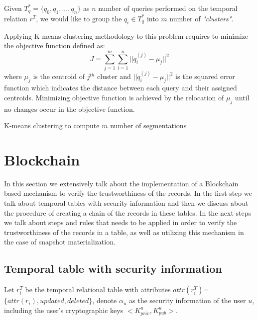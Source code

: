 \begin{prop} 
	Given $T_q^* = \{q_0,q_1,...,q_n\}$ as $n$ number of queries performed on the temporal relation $r^T$, we would like to group the $q_i \in T_q^*$ into $m$ number of \textit{"clusters"}. 
\label{prop:heuristic_method}
\end{prop}
Applying K-means clustering methodology to this problem requires to minimize the objective function defined as:
$$J = \sum_{j=1}^{m} \sum_{i=1}^{n} ||q_i^{(j)}-\mu_j||^2$$
where $\mu_j$ is the centroid of $j^{th}$ cluster and $||q_i^{(j)}-\mu_j||^2$ is the squared error function which indicates the distance between each query and their assigned centroids.
Minimizing objective function is achieved by the relocation of $\mu_j$ until no changes occur in the objective function.

\begin{algorithm}[H]
\SetAlgoLined
\caption{K-means clustering to compute $m$ number of segmentations}
\label{alg:Kmeans}
\DontPrintSemicolon
\end{algorithm}

\section{Blockchain}
In this section we extensively talk about the implementation of a Blockchain based mechanism to verify the trustworthiness of the records. In the first step we talk about temporal tables with security information and then we discuss about the procedure of creating a chain of the records in these tables. In the next steps we talk about steps and rules that needs to be applied in order to verify the trustworthiness of the records in a table, as well as utilizing this mechanism in the case of snapshot materialization.

\subsection{Temporal table with security information}
Let $r_i^T$ be the temporal relational table with attributes $attr(r_i^T)$=$\{attr(r_i), updated,deleted\}$, denote $\alpha_u$ as the security information of the user $u$, including the user's cryptographic keys $<K_{priv}^u, K_{pub}^u>$.


